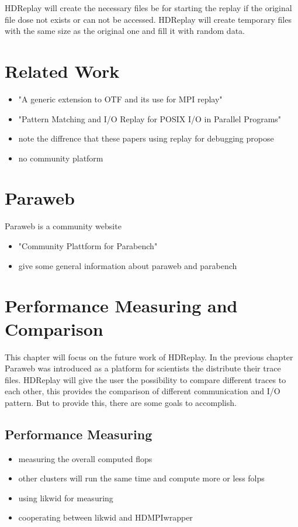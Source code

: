 HDReplay will create the necessary files be for starting the replay if the
original file dose not exists or can not be accessed. HDReplay will create
temporary files with the same size as the original one and fill it with random
data.
 
\section{Related Work}

\begin{itemize}
  \item "A generic extension to OTF and its use for MPI replay"
  \item "Pattern Matching and I/O Replay for POSIX I/O in Parallel Programs"
  \item note the diffrence that these papers using replay for debugging propose
  \item no community platform 
\end{itemize}

\section{Paraweb}
Paraweb is a community website

\begin{itemize}
  \item "Community Plattform for Parabench"
  \item give some general information about paraweb and parabench
\end{itemize}




\section*{Performance Measuring and Comparison}
\label{performance}
This chapter will focus on the future work of HDReplay. In the previous chapter
Paraweb was introduced as a platform for scientists the distribute their trace
files. HDReplay will give the user the possibility to compare different traces 
to each other, this provides the comparison of different communication and I/O
pattern. But to provide this, there are some goals to accomplish. 

\subsection{Performance Measuring}
\begin{itemize}
  \item measuring the overall computed flops 
  \item other clusters will run the same time and compute more or less folps
  \item using likwid for measuring
  \item cooperating between likwid and HDMPIwrapper
\end{itemize}

